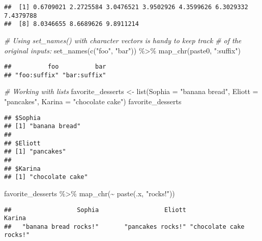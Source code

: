 \documentclass[
]{book}
\newenvironment{Shaded}{\begin{snugshade}}{\end{snugshade}}
\newcommand{\AttributeTok}[1]{\textcolor[rgb]{0.77,0.63,0.00}{#1}}
\newcommand{\CommentTok}[1]{\textcolor[rgb]{0.56,0.35,0.01}{\textit{#1}}}
\newcommand{\FunctionTok}[1]{\textcolor[rgb]{0.00,0.00,0.00}{#1}}
\newcommand{\NormalTok}[1]{#1}
\newcommand{\OtherTok}[1]{\textcolor[rgb]{0.56,0.35,0.01}{#1}}
\newcommand{\SpecialCharTok}[1]{\textcolor[rgb]{0.00,0.00,0.00}{#1}}
\newcommand{\StringTok}[1]{\textcolor[rgb]{0.31,0.60,0.02}{#1}}
\begin{document}
\begin{verbatim}
##  [1] 0.6709021 2.2725584 3.0476521 3.9502926 4.3599626 6.3029332 7.4379788
##  [8] 8.0346655 8.6689626 9.8911214
\end{verbatim}

\begin{Shaded}
\begin{Highlighting}[]
\CommentTok{\# Using set\_names() with character vectors is handy to keep track}
\CommentTok{\# of the original inputs:}
\FunctionTok{set\_names}\NormalTok{(}\FunctionTok{c}\NormalTok{(}\StringTok{"foo"}\NormalTok{, }\StringTok{"bar"}\NormalTok{)) }\SpecialCharTok{\%\textgreater{}\%} 
  \FunctionTok{map\_chr}\NormalTok{(paste0, }\StringTok{":suffix"}\NormalTok{)}
\end{Highlighting}
\end{Shaded}

\begin{verbatim}
##          foo          bar 
## "foo:suffix" "bar:suffix"
\end{verbatim}

\begin{Shaded}
\begin{Highlighting}[]
\CommentTok{\# Working with lists}
\NormalTok{favorite\_desserts }\OtherTok{\textless{}{-}} \FunctionTok{list}\NormalTok{(}\AttributeTok{Sophia =} \StringTok{"banana bread"}\NormalTok{, }\AttributeTok{Eliott =} \StringTok{"pancakes"}\NormalTok{, }\AttributeTok{Karina =} \StringTok{"chocolate cake"}\NormalTok{)}
\NormalTok{favorite\_desserts}
\end{Highlighting}
\end{Shaded}

\begin{verbatim}
## $Sophia
## [1] "banana bread"
## 
## $Eliott
## [1] "pancakes"
## 
## $Karina
## [1] "chocolate cake"
\end{verbatim}

\begin{Shaded}
\begin{Highlighting}[]
\NormalTok{favorite\_desserts }\SpecialCharTok{\%\textgreater{}\%} 
  \FunctionTok{map\_chr}\NormalTok{(}\SpecialCharTok{\textasciitilde{}} \FunctionTok{paste}\NormalTok{(.x, }\StringTok{"rocks!"}\NormalTok{))}
\end{Highlighting}
\end{Shaded}

\begin{verbatim}
##                  Sophia                  Eliott                  Karina 
##   "banana bread rocks!"       "pancakes rocks!" "chocolate cake rocks!"
\end{verbatim}
\end{document}
